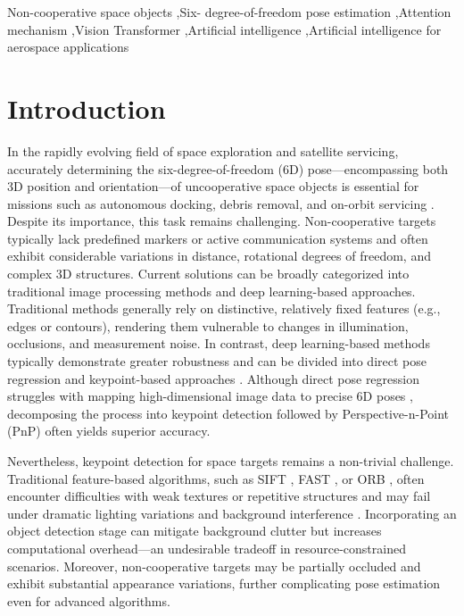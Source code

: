 \documentclass[a4paper,fleqn]{cas-sc}
\begin{document}
\begin{keywords}
Non-cooperative space objects \sep Six-
degree-of-freedom pose estimation
\sep Attention mechanism
\sep Vision Transformer
\sep Artificial intelligence
\sep Artificial intelligence for aerospace applications
\end{keywords}

\maketitle 

\section{Introduction}
In the rapidly evolving field of space exploration and satellite servicing, accurately determining the six-degree-of-freedom (6D) pose—encompassing both 3D position and orientation—of uncooperative space objects is essential for missions such as autonomous docking, debris removal, and on-orbit servicing \citep{d2014pose,modelbased_algorithm,capuano2019robust}. Despite its importance, this task remains challenging. Non-cooperative targets typically lack predefined markers or active communication systems and often exhibit considerable variations in distance, rotational degrees of freedom, and complex 3D structures. Current solutions can be broadly categorized into traditional image processing methods and deep learning-based approaches. Traditional methods generally rely on distinctive, relatively fixed features (e.g., edges or contours), rendering them vulnerable to changes in illumination, occlusions, and measurement noise. In contrast, deep learning-based methods typically demonstrate greater robustness and can be divided into direct pose regression and keypoint-based approaches \citep{huan2020pose,park2019towards,wang2022revisiting}. Although direct pose regression struggles with mapping high-dimensional image data to precise 6D poses \citep{sharma2018pose,sharma2019pose}, decomposing the process into keypoint detection followed by Perspective-n-Point (PnP) often yields superior accuracy.

Nevertheless, keypoint detection for space targets remains a non-trivial challenge. Traditional feature-based algorithms, such as SIFT \citep{sift}, FAST \citep{fast}, or ORB \citep{orb}, often encounter difficulties with weak textures or repetitive structures and may fail under dramatic lighting variations and background interference \citep{Dai2019Comparison,bojanic2019comparison}. Incorporating an object detection stage \citep{chen2019satellite,park2019towards,black2021real,wang2022revisiting} can mitigate background clutter but increases computational overhead—an undesirable tradeoff in resource-constrained scenarios. Moreover, non-cooperative targets may be partially occluded and exhibit substantial appearance variations, further complicating pose estimation even for advanced algorithms.
\end{document}
